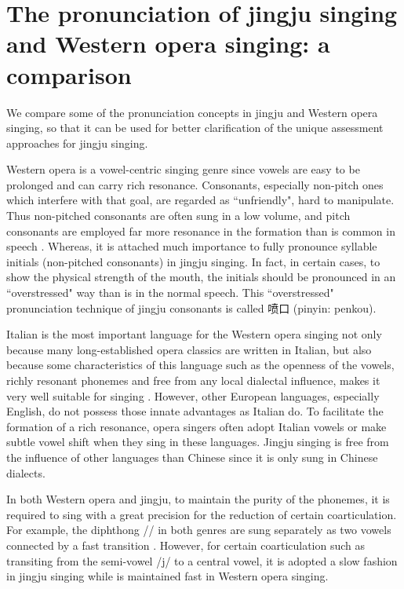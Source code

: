 \section{The pronunciation of jingju singing and Western opera singing: a comparison}

We compare some of the pronunciation concepts in jingju and Western opera singing, so that it can be used for better clarification of the unique assessment approaches for jingju singing.

Western opera is a vowel-centric singing genre since vowels are easy to be prolonged and can carry rich resonance. Consonants, especially non-pitch ones which interfere with that goal, are regarded as ``unfriendly", hard to manipulate. Thus non-pitched consonants are often sung in a low volume, and pitch consonants are employed far more resonance in the formation than is common in speech \cite{Nair1999}. Whereas, it is attached much importance to fully pronounce syllable initials (non-pitched consonants) in jingju singing. In fact, in certain cases, to show the physical strength of the mouth, the initials should be pronounced in an ``overstressed" way than is in the normal speech. This ``overstressed" pronunciation technique of jingju consonants is called 喷口 (pinyin: penkou).

Italian is the most important language for the Western opera singing not only because many long-established opera classics are written in Italian, but also because some characteristics of this language such as the openness of the vowels, richly resonant phonemes and free from any local dialectal influence, makes it very well suitable for singing \cite{Nair1999}. However, other European languages, especially English, do not possess those innate advantages as Italian do. To facilitate the formation of a rich resonance, opera singers often adopt Italian vowels or make subtle vowel shift \cite{Nair1999} when they sing in these languages. Jingju singing is free from the influence of other languages than Chinese since it is only sung in Chinese dialects.

In both Western opera and jingju, to maintain the purity of the phonemes, it is required to sing with a great precision for the reduction of certain coarticulation. For example, the diphthong // in both genres are sung separately as two vowels connected by a fast transition \cite{Nair1999}. However, for certain coarticulation such as transiting from the semi-vowel /j/ to a central vowel, it is adopted a slow fashion in jingju singing while is maintained fast in Western opera singing.

